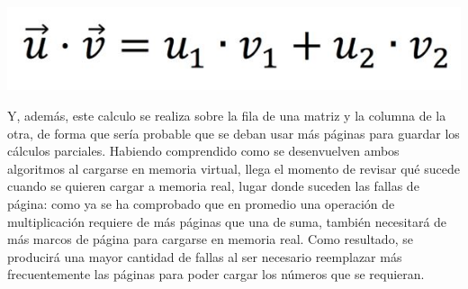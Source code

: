 \documentclass[a4paper]{article}
\begin{document}
\begin{center}
    \includegraphics[scale=0.5]{prod_p.jpeg}    
\end{center}


Y, además, este calculo se realiza sobre la fila de una matriz y la columna de la otra, de forma que sería probable que se deban usar más páginas para guardar los cálculos parciales. Habiendo comprendido como se desenvuelven ambos algoritmos al cargarse en memoria virtual, llega el momento de revisar qué sucede cuando se quieren cargar a memoria real, lugar donde suceden las fallas de página: como ya se ha comprobado que en promedio una operación de multiplicación requiere de más páginas que una de suma, también necesitará de más marcos de página para cargarse en memoria real. Como resultado, se producirá una mayor cantidad de fallas al ser necesario reemplazar más frecuentemente las páginas para poder cargar los números que se requieran.
\end{document}

